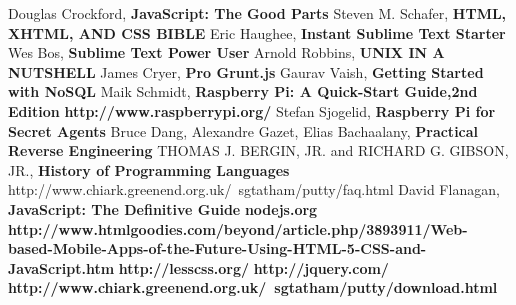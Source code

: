 \documentclass[
12pt, %
english, %
singlespacing, %
oneside,
headsepline, %
]{MastersDoctoralThesis} %
\begin{document}
\begin{thebibliography}{999}
	Douglas Crockford, \textbf{JavaScript: The Good Parts}
	Steven M. Schafer, \textbf{HTML, XHTML, AND CSS BIBLE}
	Eric Haughee, \textbf{Instant Sublime Text Starter}
	Wes Bos, \textbf{Sublime Text Power User}
	Arnold Robbins, \textbf{UNIX IN A NUTSHELL}
	James Cryer, \textbf{Pro Grunt.js}
	Gaurav Vaish, \textbf{Getting Started with NoSQL}
	Maik Schmidt, \textbf{Raspberry Pi: A Quick-Start Guide,2nd Edition}
	\textbf{http://www.raspberrypi.org/}
	Stefan Sjogelid, \textbf{Raspberry Pi for Secret Agents}
	Bruce Dang, Alexandre Gazet, Elias Bachaalany, \textbf{Practical Reverse Engineering}
	THOMAS J. BERGIN, JR. and RICHARD G. GIBSON, JR., \textbf{History of Programming Languages}
	http://www.chiark.greenend.org.uk/~sgtatham/putty/faq.html
	David Flanagan, \textbf{JavaScript: The Definitive Guide}
	\textbf{nodejs.org}
	\textbf{http://www.htmlgoodies.com/beyond/article.php/3893911/Web-based-Mobile-Apps-of-the-Future-Using-HTML-5-CSS-and-JavaScript.htm}
	\textbf{http://lesscss.org/}
	\textbf{http://jquery.com/}
	\textbf{http://www.chiark.greenend.org.uk/~sgtatham/putty/download.html}
\end{thebibliography}
\end{document}
